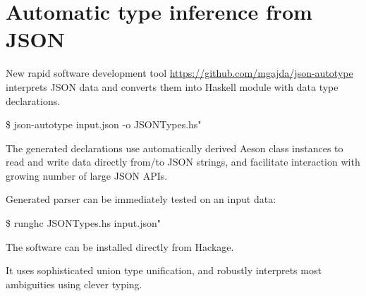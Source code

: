 \section{Automatic type inference from JSON}

New rapid software development tool \href{\texttt{json-autotype}}{https://github.com/mgajda/json-autotype} interprets JSON
data and converts them into Haskell module with data type declarations.

\begin{code}
\$ json-autotype input.json -o JSONTypes.hs"
\end{code}

The generated declarations use automatically derived Aeson class instances
to read and write data directly from/to JSON strings,
and facilitate interaction with growing number of large JSON APIs.

Generated parser can be immediately tested on an input data:

\begin{code}
\$ runghc JSONTypes.hs input.json"
\end{code}

The software can be installed directly from Hackage.

It uses sophisticated union type unification, and robustly
interprets most ambiguities using clever typing.
